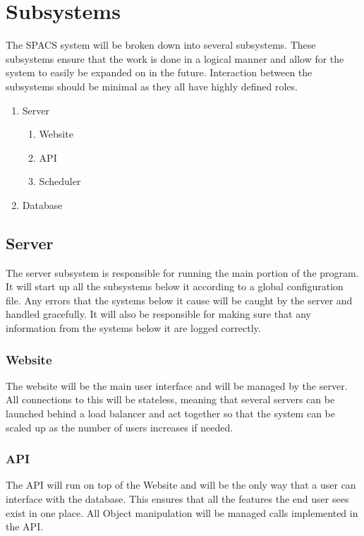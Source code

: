\section{Subsystems}

\par
The SPACS system will be broken down into several subsystems. These subsystems ensure that the work is done in a logical manner and allow for the system to easily be expanded on in the future. Interaction between the subsystems should be minimal as they all have highly defined roles.

\par
\begin{enumerate}
	\item Server
	\begin{enumerate}
		\item Website
		\item API
		\item Scheduler
	\end{enumerate}
	\item Database
\end{enumerate}

\subsection{Server}
\par
The server subsystem is responsible for running the main portion of the program. It will start up all the subsystems below it according to a global configuration file. Any errors that the systems below it cause will be caught by the server and handled gracefully. It will also be responsible for making sure that any information from the systems below it are logged correctly.

\subsubsection{Website}
\par
The website will be the main user interface and will be managed by the server. All connections to this will be stateless, meaning that several servers can be launched behind a load balancer and act together so that the system can be scaled up as the number of users increases if needed.

\subsubsection{API}
\par
The API will run on top of the Website and will be the only way that a user can interface with the database. This ensures that all the features the end user sees exist in one place. All Object manipulation will be managed calls implemented in the API.

